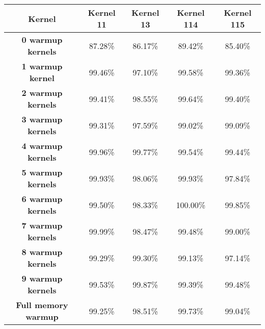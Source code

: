 \begin{tabular}{ |c|c|c|c|c |}
    \hline
    \textbf{Kernel} & Kernel 11 & Kernel 13 & Kernel 114 & Kernel 115 \\
    \hline
    \hline
    \textbf{0 warmup kernels} & 87.28\% & 86.17\% & 89.42\% & 85.40\% \\
    \textbf{1 warmup kernel} & 99.46\% & 97.10\% & 99.58\% & 99.36\% \\
    \textbf{2 warmup kernels} & 99.41\% & 98.55\% & 99.64\% & 99.40\% \\
    \textbf{3 warmup kernels} & 99.31\% & 97.59\% & 99.02\% & 99.09\% \\
    \textbf{4 warmup kernels} & 99.96\% & 99.77\% & 99.54\% & 99.44\% \\
    \textbf{5 warmup kernels} & 99.93\% & 98.06\% & 99.93\% & 97.84\% \\
    \textbf{6 warmup kernels} & 99.50\% & 98.33\% & 100.00\% & 99.85\% \\
    \textbf{7 warmup kernels} & 99.99\% & 98.47\% & 99.48\% & 99.00\% \\
    \textbf{8 warmup kernels} & 99.29\% & 99.30\% & 99.13\% & 97.14\% \\
    \textbf{9 warmup kernels} & 99.53\% & 99.87\% & 99.39\% & 99.48\% \\
    \textbf{Full memory warmup} & 99.25\% & 98.51\% & 99.73\% & 99.04\% \\
    \hline
\end{tabular}
